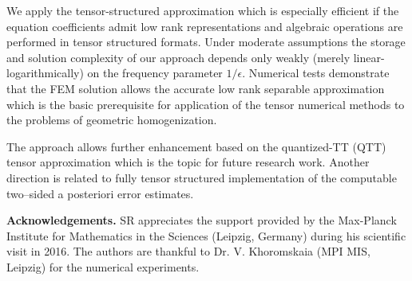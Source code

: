 \documentclass[amstex,amstext,amsfonts,epsf,12pt] {amsart}
\begin{document}
We apply the tensor-structured approximation which is especially efficient
if the equation coefficients admit low rank representations and algebraic operations
are performed in tensor structured formats.
Under moderate assumptions the storage and solution complexity
of our approach depends only weakly (merely linear-logarithmically) 
on the frequency parameter $1/\epsilon$. 
Numerical tests demonstrate that the FEM solution allows the accurate 
low rank separable approximation which is the basic prerequisite
for application of the tensor numerical methods to the problems of geometric homogenization.

The approach allows further enhancement based on the quantized-TT (QTT)
tensor approximation which is the topic for future research work.
Another direction is related to fully tensor structured implementation of the 
computable two--sided a posteriori error estimates.
 

\vspace{0.3cm}
{\bf Acknowledgements.} 
SR appreciates the support provided by the Max-Planck Institute
for Mathematics in the Sciences (Leipzig, Germany) during his scientific visit in 2016.
The authors are thankful to Dr. V. Khoromskaia (MPI MIS, Leipzig) 
for  the numerical experiments.

% 
\end{document}
